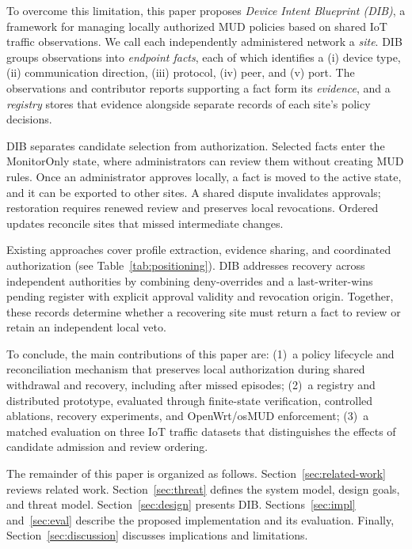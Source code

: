 \documentclass[journal]{IEEEtran}
\theoremstyle{definition}
\begin{document}
To overcome this limitation, this paper proposes \emph{Device Intent Blueprint (DIB)}, a framework for managing locally authorized MUD policies based on shared IoT traffic observations. We call each independently administered network a \emph{site}. DIB groups observations into \emph{endpoint facts}, each of which identifies a (i) device type, (ii) communication direction, (iii) protocol, (iv) peer, and (v) port. The observations and contributor reports supporting a fact form its \emph{evidence}, and a \emph{registry} stores that evidence alongside separate records of each site's policy decisions.

DIB separates candidate selection from authorization. Selected facts enter the MonitorOnly state, where administrators can review them without creating MUD rules.
Once an administrator approves locally, a fact is moved to the active state, and it can be exported to other sites. A shared dispute invalidates approvals; restoration requires renewed review and preserves local revocations. Ordered updates reconcile sites that missed intermediate changes.


Existing approaches cover profile extraction, evidence sharing, and coordinated authorization (see Table~\ref{tab:positioning}). DIB addresses recovery across independent authorities by combining deny-overrides and a last-writer-wins pending register with explicit approval validity and revocation origin. Together, these records determine whether a recovering site must return a fact to review or retain an independent local veto.

To conclude, the main contributions of this paper are:
(1)~a policy lifecycle and reconciliation mechanism that preserves local authorization during shared withdrawal and recovery, including after missed episodes;
(2)~a registry and distributed prototype, evaluated through finite-state verification, controlled ablations, recovery experiments, and OpenWrt/osMUD enforcement;
(3)~a matched evaluation on three IoT traffic datasets that distinguishes the effects of candidate admission and review ordering.


The remainder of this paper is organized as follows. Section~\ref{sec:related-work} reviews related work. Section~\ref{sec:threat} defines the system model, design goals, and threat model. Section~\ref{sec:design} presents DIB. Sections~\ref{sec:impl} and~\ref{sec:eval} describe the proposed implementation and its evaluation. Finally, Section~\ref{sec:discussion} discusses implications and limitations.
\end{document}
